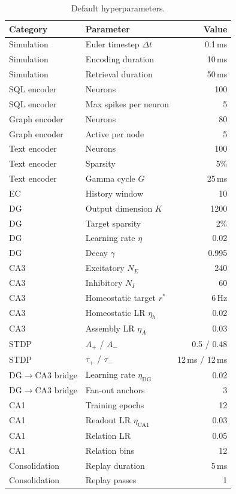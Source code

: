 \begin{table}[h]
\centering
\caption{Default hyperparameters.}
\label{tab:hyperparams}
\begin{tabular}{@{}llr@{}}
\toprule
\textbf{Category} & \textbf{Parameter} & \textbf{Value} \\
\midrule
Simulation & Euler timestep $\Delta t$ & 0.1\,ms \\
Simulation & Encoding duration & 10\,ms \\
Simulation & Retrieval duration & 50\,ms \\
SQL encoder & Neurons & 100 \\
SQL encoder & Max spikes per neuron & 5 \\
Graph encoder & Neurons & 80 \\
Graph encoder & Active per node & 5 \\
Text encoder & Neurons & 100 \\
Text encoder & Sparsity & 5\% \\
Text encoder & Gamma cycle $G$ & 25\,ms \\
EC & History window & 10 \\
DG & Output dimension $K$ & 1200 \\
DG & Target sparsity & 2\% \\
DG & Learning rate $\eta$ & 0.02 \\
DG & Decay $\gamma$ & 0.995 \\
CA3 & Excitatory $N_E$ & 240 \\
CA3 & Inhibitory $N_I$ & 60 \\
CA3 & Homeostatic target $r^*$ & 6\,Hz \\
CA3 & Homeostatic LR $\eta_h$ & 0.02 \\
CA3 & Assembly LR $\eta_A$ & 0.03 \\
STDP & $A_+$ / $A_-$ & 0.5 / 0.48 \\
STDP & $\tau_+$ / $\tau_-$ & 12\,ms / 12\,ms \\
DG$\rightarrow$CA3 bridge & Learning rate $\eta_{\mathrm{DG}}$ & 0.02 \\
DG$\rightarrow$CA3 bridge & Fan-out anchors & 3 \\
CA1 & Training epochs & 12 \\
CA1 & Readout LR $\eta_{\mathrm{CA1}}$ & 0.03 \\
CA1 & Relation LR & 0.05 \\
CA1 & Relation bins & 12 \\
Consolidation & Replay duration & 5\,ms \\
Consolidation & Replay passes & 1 \\
\bottomrule
\end{tabular}
\end{table}
